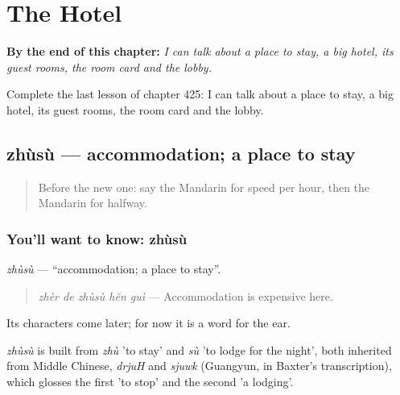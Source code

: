 
\chapter{The Hotel}
\label{ch:zh-the-hotel}

\begin{chapteropening}
\textbf{By the end of this chapter:} \emph{I can talk about a place to stay, a big hotel, its guest rooms, the room card and the lobby.}

Complete the last lesson of chapter 425: I can talk about a place to stay, a big hotel, its guest rooms, the room card and the lobby.
\end{chapteropening}

\section[zhùsù]{zhùsù — accommodation; a place to stay}

\label{lesson:ZH-C425-zhusu}



\begin{quote}
Before the new one: say the Mandarin for speed per hour, then the Mandarin for halfway.
\end{quote}

\subsection*{You'll want to know: zhùsù}
\emph{zhùsù} — \textquotedblleft{}accommodation; a place to stay\textquotedblright{}.

\begin{quote}
\emph{zhèr de zhùsù hěn guì} — Accommodation is expensive here.
\end{quote}

Its characters come later; for now it is a word for the ear.

\begin{cousinweb}
\emph{zhùsù} is built from \emph{zhù} 'to stay' and \emph{sù} 'to lodge for the night', both inherited from Middle Chinese, \emph{drjuH} and \emph{sjuwk} (Guangyun, in Baxter's transcription), which glosses the first 'to stop' and the second 'a lodging'.
\end{cousinweb}


